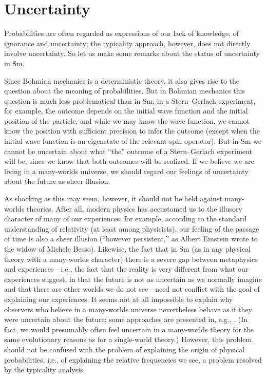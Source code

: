 \documentclass[12pt]{article}
\newcommand{\x}[1]{{#1}}
\begin{document}
\section{Uncertainty}
\label{sec:uncertainty}

Probabilities are often regarded as expressions of our lack of knowledge, of ignorance and uncertainty; the typicality approach, however, does not directly involve uncertainty. So let us make some remarks about the status of uncertainty \x{in Sm}.

Since Bohmian mechanics is a deterministic theory, it also gives rise to the question about the meaning of probabilities. But in Bohmian mechanics this question is much less problematical than in Sm; in a Stern--Gerlach experiment, for example, the outcome depends on the initial wave function and the initial position of the particle, and while we may know the wave function, we cannot know the position with sufficient precision to infer the outcome (except when the initial wave function is an eigenstate of the relevant spin operator). But in Sm we cannot be uncertain about what ``the'' outcome of a Stern--Gerlach experiment will be, since we know that both outcomes will be realized. If we believe we are living in a many-worlds universe, we should regard our feelings of uncertainty about the future as sheer illusion.  

As shocking as this may seem, \x{however,} it should not be held against many-worlds theories. After all, modern physics has accustomed us to the illusory character of many of our experiences; for example, according to the standard understanding of relativity (at least among physicists), our feeling of the passage of time is also a sheer illusion (``however persistent,'' as Albert Einstein wrote to the widow of Michele Besso). Likewise, the fact that in Sm (as in any physical theory with a many-worlds character) there is a severe gap between metaphysics and experiences---i.e., the fact that the reality is very different from what our experiences suggest, in that the future is not as uncertain as we normally imagine and that there are other worlds we do not see---need not conflict with the goal of explaining our experiences. It seems not at all impossible to explain why observers who believe in a many-worlds universe nevertheless behave as if they were uncertain about the future; some approaches are presented in, e.g., \cite{wallace06, tappenden, greaves2004, lewis2007, baker2007, saunderswallace}. (In fact, we would presumably often feel uncertain in a many-worlds theory for the same evolutionary reasons as for a single-world theory.)  However, this problem should not be confused with the problem of explaining the origin of physical probabilities, i.e., of explaining the relative frequencies we see, a problem resolved by the typicality analysis.
\end{document}
